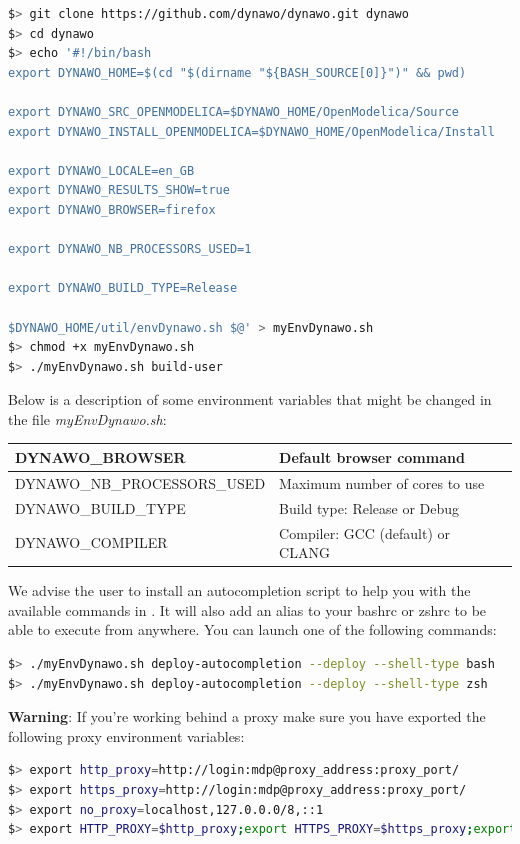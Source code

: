 \documentclass[a4paper, 12pt]{report}
\begin{document}
\begin{lstlisting}[language=bash]
$> git clone https://github.com/dynawo/dynawo.git dynawo
$> cd dynawo
$> echo '#!/bin/bash
export DYNAWO_HOME=$(cd "$(dirname "${BASH_SOURCE[0]}")" && pwd)

export DYNAWO_SRC_OPENMODELICA=$DYNAWO_HOME/OpenModelica/Source
export DYNAWO_INSTALL_OPENMODELICA=$DYNAWO_HOME/OpenModelica/Install

export DYNAWO_LOCALE=en_GB
export DYNAWO_RESULTS_SHOW=true
export DYNAWO_BROWSER=firefox

export DYNAWO_NB_PROCESSORS_USED=1

export DYNAWO_BUILD_TYPE=Release

$DYNAWO_HOME/util/envDynawo.sh $@' > myEnvDynawo.sh
$> chmod +x myEnvDynawo.sh
$> ./myEnvDynawo.sh build-user
\end{lstlisting}

Below is a description of some environment variables that might be changed in the file \textit{myEnvDynawo.sh}:

\begin{center}
\begin{tabular}{|l|l|}
  \hline
   DYNAWO\_BROWSER & Default browser command \\
  \hline
   DYNAWO\_NB\_PROCESSORS\_USED & Maximum number of cores to use \\
  \hline
   DYNAWO\_BUILD\_TYPE & Build type: Release or Debug \\
  \hline
   DYNAWO\_COMPILER & Compiler: GCC (default) or CLANG \\
  \hline
\end{tabular}
\end{center}

We advise the user to install an autocompletion script to help you with the available commands in \Dynawo.
It will also add an alias to your bashrc or zshrc to be able to execute \Dynawo from anywhere. You can launch one of the following commands:
\begin{lstlisting}[language=bash,deletekeywords={help,source}]
$> ./myEnvDynawo.sh deploy-autocompletion --deploy --shell-type bash
$> ./myEnvDynawo.sh deploy-autocompletion --deploy --shell-type zsh
\end{lstlisting}

\textbf{Warning}: If you're working behind a proxy make sure you have exported the following proxy environment variables:

\begin{lstlisting}[language=bash]
$> export http_proxy=http://login:mdp@proxy_address:proxy_port/
$> export https_proxy=http://login:mdp@proxy_address:proxy_port/
$> export no_proxy=localhost,127.0.0.0/8,::1
$> export HTTP_PROXY=$http_proxy;export HTTPS_PROXY=$https_proxy;export NO_PROXY=$no_proxy;
\end{lstlisting}
\end{document}
